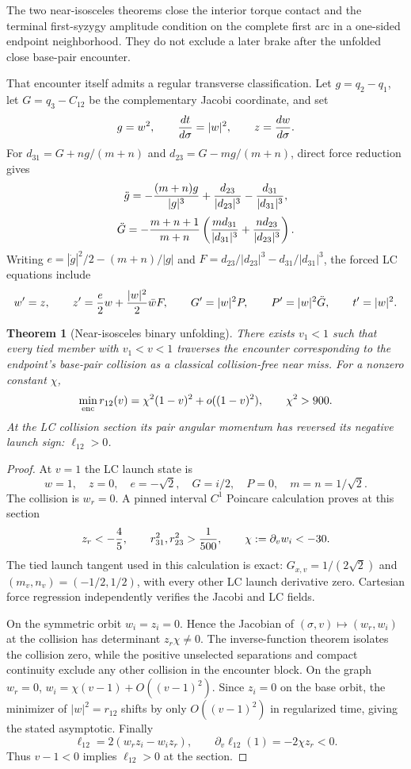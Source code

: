 \documentclass[11pt]{article}
\newtheorem{theorem}{Theorem}
\begin{document}
The two near-isosceles theorems close the interior torque contact and the
terminal first-syzygy amplitude condition on the complete first arc in a
one-sided endpoint neighborhood.  They do not exclude a later brake after
the unfolded close base-pair encounter.

That encounter itself admits a regular transverse classification.  Let
$g=q_2-q_1$, let $G=q_3-C_{12}$ be the complementary Jacobi coordinate, and
set
\[
 g=w^2,\qquad {dt\over d\sigma}=|w|^2,\qquad z={dw\over d\sigma}.
\]
For $d_{31}=G+ng/(m+n)$ and $d_{23}=G-mg/(m+n)$, direct force reduction
gives
\[
 \ddot g=-{(m+n)g\over|g|^3}
 +{d_{23}\over|d_{23}|^3}-{d_{31}\over|d_{31}|^3},
\]
\[
 \ddot G=-{m+n+1\over m+n}\left(
 {m d_{31}\over|d_{31}|^3}+{n d_{23}\over|d_{23}|^3}\right).
\]
Writing $e=|\dot g|^2/2-(m+n)/|g|$ and
$F=d_{23}/|d_{23}|^3-d_{31}/|d_{31}|^3$, the forced LC equations include
\[
 w'=z,\qquad z'={e\over2}w+{|w|^2\over2}\bar wF,\qquad
 G'=|w|^2P,\qquad P'=|w|^2\ddot G,\qquad t'=|w|^2.
\]

\begin{theorem}[Near-isosceles binary unfolding]
There exists $v_1<1$ such that every tied member with $v_1<v<1$ traverses
the encounter corresponding to the endpoint's base-pair collision as a
classical collision-free near miss.  For a nonzero constant $\chi$,
\[
 \min_{\rm enc}r_{12}(v)=\chi^2(1-v)^2+o((1-v)^2),\qquad \chi^2>900.
\]
At the LC collision section its pair angular momentum has reversed its
negative launch sign: $\ell_{12}>0$.
\end{theorem}

\begin{proof}
At $v=1$ the LC launch state is
\[
 w=1,\quad z=0,\quad e=-\sqrt2,\quad G=i/2,\quad P=0,
 \quad m=n=1/\sqrt2.
\]
The collision is $w_r=0$.  A pinned interval $C^1$ Poincare calculation
proves at this section
\[
 z_r<-{4\over5},\qquad r_{31}^2,r_{23}^2>{1\over500},\qquad
 \chi:=\partial_vw_i<-30.
\]
The tied launch tangent used in this calculation is exact:
$G_{x,v}=1/(2\sqrt2)$ and $(m_v,n_v)=(-1/2,1/2)$, with every other LC
launch derivative zero.  Cartesian force regression independently verifies
the Jacobi and LC fields.

On the symmetric orbit $w_i=z_i=0$.  Hence the Jacobian of
$(\sigma,v)\mapsto(w_r,w_i)$ at the collision has determinant
$z_r\chi\ne0$.  The inverse-function theorem isolates the collision zero,
while the positive unselected separations and compact continuity exclude any
other collision in the encounter block.  On the graph $w_r=0$,
$w_i=\chi(v-1)+O((v-1)^2)$.  Since $z_i=0$ on the base orbit, the minimizer
of $|w|^2=r_{12}$ shifts by only $O((v-1)^2)$ in regularized time, giving
the stated asymptotic.  Finally
\[
 \ell_{12}=2(w_rz_i-w_iz_r),\qquad
 \partial_v\ell_{12}(1)=-2\chi z_r<0.
\]
Thus $v-1<0$ implies $\ell_{12}>0$ at the section.
\end{proof}
\end{document}

